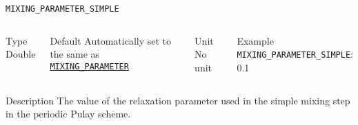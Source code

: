 \documentclass[xcolor=dvipsnames,t]{beamer}
\begin{document}
\begin{frame}[allowframebreaks]{\texttt{MIXING\_PARAMETER\_SIMPLE}} \label{MIXING_PARAMETER_SIMPLE}
\vspace*{-12pt}
\begin{columns}
\begin{block}{Type}
Double
\end{block}

\begin{block}{Default}
Automatically set to the same as \hyperlink{MIXING_PARAMETER}{\texttt{MIXING\_PARAMETER}}
\end{block}

\begin{block}{Unit}
No unit
\end{block}

\begin{block}{Example}
\texttt{MIXING\_PARAMETER\_SIMPLE}: 0.1
\end{block}
\end{columns}

\begin{block}{Description}
The value of the relaxation parameter used in the simple mixing step in the periodic Pulay scheme.
\end{block}

\end{frame}
\end{document}
